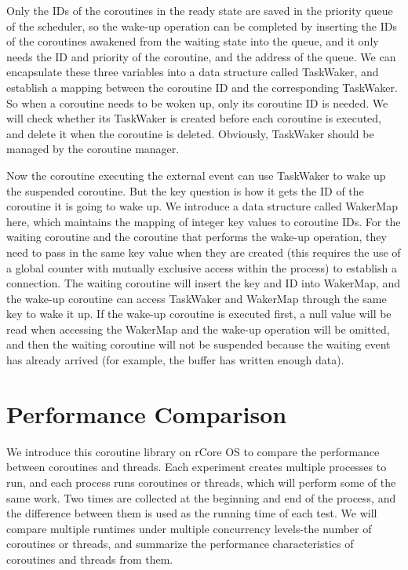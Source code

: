 \documentclass[conference]{IEEEtran}
\begin{document}
 Only the IDs of the coroutines in the ready state are saved in the priority queue of the scheduler, so the wake-up operation can be completed by inserting the IDs of the coroutines awakened from the waiting state into the queue, and it only needs the ID and priority of the coroutine, and the address of the queue. We can encapsulate these three variables into a data structure called TaskWaker, and establish a mapping between the coroutine ID and the corresponding TaskWaker. So when a coroutine needs to be woken up, only its coroutine ID is needed. We will check whether its TaskWaker is created before each coroutine is executed, and delete it when the coroutine is deleted. Obviously, TaskWaker should be managed by the coroutine manager.

Now the coroutine executing the external event can use TaskWaker to wake up the suspended coroutine. But the key question is how it gets the ID of the coroutine it is going to wake up. We introduce a data structure called WakerMap here, which maintains the mapping of integer key values to coroutine IDs. For the waiting coroutine and the coroutine that performs the wake-up operation, they need to pass in the same key value when they are created (this requires the use of a global counter with mutually exclusive access within the process) to establish a connection. The waiting coroutine will insert the key and ID into WakerMap, and the wake-up coroutine can access TaskWaker and WakerMap through the same key to wake it up. If the wake-up coroutine is executed first, a null value will be read when accessing the WakerMap and the wake-up operation will be omitted, and then the waiting coroutine will not be suspended because the waiting event has already arrived (for example, the buffer has written enough data).


\section{Performance Comparison}

We introduce this coroutine library on rCore OS to compare the performance between coroutines and threads. Each experiment creates multiple processes to run, and each process runs coroutines or threads, which will perform some of the same work. Two times are collected at the beginning and end of the process, and the difference between them is used as the running time of each test. We will compare multiple runtimes under multiple concurrency levels-the number of coroutines or threads, and summarize the performance characteristics of coroutines and threads from them.
\end{document}
